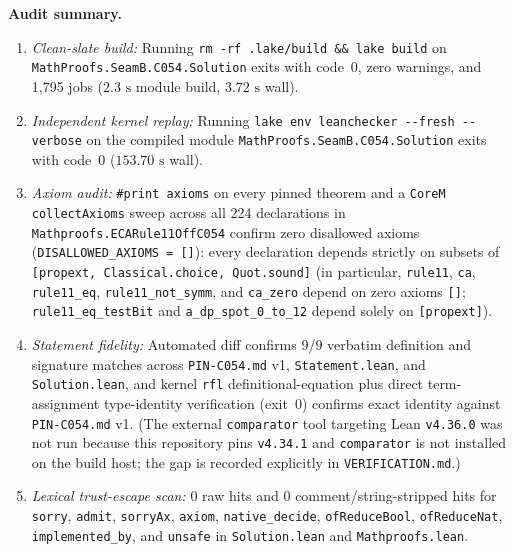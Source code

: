\documentclass[11pt]{article}
\theoremstyle{definition}
\begin{document}
\noindent\textbf{Audit summary.}
\begin{enumerate}\setlength{\itemsep}{2pt}
\item \emph{Clean-slate build:} Running \texttt{rm -rf .lake/build \&\& lake build} on \nolinkurl{MathProofs.SeamB.C054.Solution} exits with code~$0$, zero warnings, and 1{,}795 jobs ($2.3\text{ s}$ module build, $3.72\text{ s}$ wall).
\item \emph{Independent kernel replay:} Running \texttt{lake env leanchecker -{}-fresh -{}-verbose} on the compiled module \nolinkurl{MathProofs.SeamB.C054.Solution} exits with code~$0$ ($153.70\text{ s}$ wall).
\item \emph{Axiom audit:} \texttt{\#print axioms} on every pinned theorem and a \texttt{CoreM} \texttt{collectAxioms} sweep across all 224 declarations in {\small\nolinkurl{Mathproofs.ECARule11OffC054}} confirm zero disallowed axioms ({\small\texttt{DISALLOWED\_AXIOMS = []}}): every declaration depends strictly on subsets of \texttt{[propext, Classical.choice, Quot.sound]} (in particular, \texttt{rule11}, \texttt{ca}, {\small\texttt{rule11\_eq}}, {\small\texttt{rule11\_not\_symm}}, and {\small\texttt{ca\_zero}} depend on zero axioms \texttt{[]}; {\small\texttt{rule11\_eq\_testBit}} and {\small\texttt{a\_dp\_spot\_0\_to\_12}} depend solely on \texttt{[propext]}).
\item \emph{Statement fidelity:} Automated diff confirms 9/9 verbatim definition and signature matches across \texttt{PIN-C054.md} v1, \texttt{Statement.lean}, and \texttt{Solution.lean}, and kernel \texttt{rfl} definitional-equation plus direct term-assignment type-identity verification (exit~$0$) confirms exact identity against \texttt{PIN-C054.md} v1. (The external \texttt{comparator} tool targeting Lean \texttt{v4.36.0} was not run because this repository pins \texttt{v4.34.1} and \texttt{comparator} is not installed on the build host; the gap is recorded explicitly in \texttt{VERIFICATION.md}.)
\item \emph{Lexical trust-escape scan:} $0$ raw hits and $0$ comment/string-stripped hits for \texttt{sorry}, \texttt{admit}, \texttt{sorryAx}, \texttt{axiom}, \texttt{native\_decide}, \texttt{ofReduceBool}, \texttt{ofReduceNat}, \texttt{implemented\_by}, and \texttt{unsafe} in \texttt{Solution.lean} and \texttt{Mathproofs.lean}.
\end{enumerate}
\end{document}
